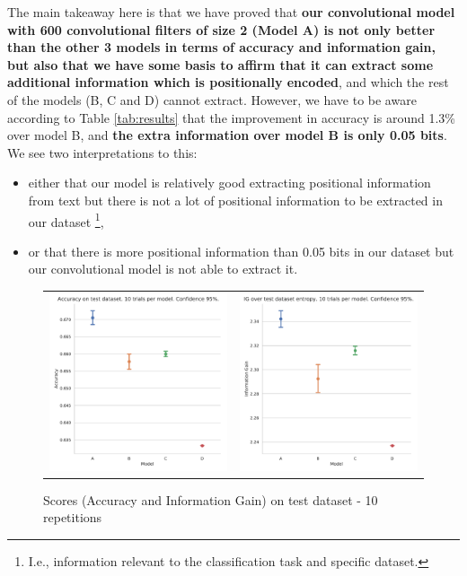 \documentclass[10pt,journal,compsoc, onecolumn]{IEEEtran}
\begin{document}
The main takeaway here is that we have proved that \textbf{our convolutional model with 600 convolutional filters of size 2 (Model A) is not only better than the other 3 models in terms of accuracy and information gain, but also that we have some basis to affirm that it can extract some additional information which is positionally encoded}, and which the rest of the models (B, C and D) cannot extract. However, we have to be aware according to Table \ref{tab:results} that the improvement in accuracy is around 1.3\% over model B, and \textbf{the extra information over model B is only 0.05 bits}. We see two interpretations to this:
\begin{itemize}
    \item either that our model is relatively good extracting positional information from text but there is not a lot of positional information to be extracted in our dataset \footnote{I.e., information relevant to the classification task and specific dataset.},
    \item or that there is more positional information than 0.05 bits in our dataset but our convolutional model is not able to extract it.
\end{itemize}


\begin{figure}[h]
\begin{tabular}{c c}
    \includegraphics[width=.5\linewidth]{images/chart_26.pdf} &
    \includegraphics[width=.5\linewidth]{images/chart_25.pdf} \\
\end{tabular}
\caption{ Scores (Accuracy and Information Gain) on test dataset - 10 repetitions}
\label{fig:scores}
\end{figure}
\end{document}
